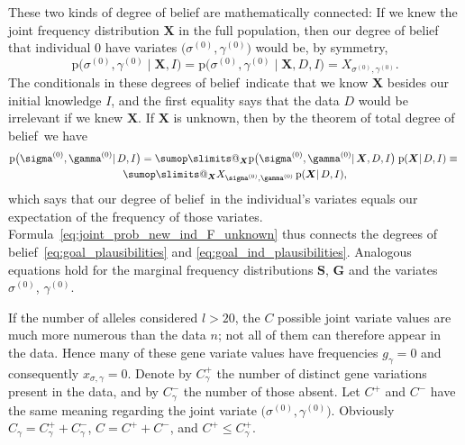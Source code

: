 \documentclass[\ifafour a4paper,12pt,\else a5paper,10pt,\fi%
onecolumn,oneside,article,%
british%
]{memoir}
\makeatletter
\theoremstyle{remark}
\theoremstyle{innote}
\def\sum{\DOTSI\sumop\slimits@}
\renewcommand{\le}{\leqslant}%
\newcommand*{\pf}{\mathrm{p}}%
\renewcommand*{\|}{\mathpunct{|}}
\newcommand*{\dob}{degree of belief}
\newcommand*{\dobs}{degrees of belief}
\newcommand*{\yD}{D}
\newcommand*{\yI}{I}
\newcommand*{\ys}{\sigma}
\newcommand*{\yg}{\gamma}
\newcommand*{\gn}{l}
\newcommand*{\ysi}[1]{\ys^{(#1)}}
\newcommand*{\ygi}[1]{\yg^{(#1)}}
\newcommand*{\yso}{\ysi{0}}
\newcommand*{\ygo}{\ygi{0}}
\newcommand*{\yFs}{\bm{S}}
\newcommand*{\yFg}{\bm{G}}
\newcommand*{\yF}{\bm{X}}
\newcommand*{\yCg}{C_{\gamma}}
\newcommand*{\yCgd}{\yCg^{+}}
\newcommand*{\yCgn}{\yCg^{-}}
\newcommand*{\yCd}{C^{+}}
\newcommand*{\yCn}{C^{-}}
\makeatother
\begin{document}
These two kinds of degree of belief are mathematically connected: If we
knew the joint frequency distribution $\yF$ in the full population, then
our degree of belief that individual $0$ have variates $\bigl( \yso,\ygo
\bigr)$ would be, by symmetry,
\begin{equation}
  \label{eq:joint_prob_new_ind_F_known}
  \pf\bigl(\yso, \ygo \| \yF, \yI\bigr)  =
  \pf\bigl(\yso, \ygo \| \yF, \yD, \yI\bigr)  =
  X_{\yso, \ygo}.
\end{equation}
The conditionals in these \dobs\ indicate that we know $\yF$ besides our
initial knowledge $\yI$, and the first equality says that the data $\yD$
would be irrelevant if we knew $\yF$. If $\yF$ is unknown, then by the
theorem of total \dob\ we have
\begin{multline}
  \label{eq:joint_prob_new_ind_F_unknown}
  \pf\bigl(\yso, \ygo \| \yD, \yI\bigr)  =
  \sum_{\yF}  \pf\bigl(\yso, \ygo \| \yF, \yD, \yI\bigr) \;
  \pf( \yF \| \yD, \yI) \equiv{}\\
  \sum_{\yF}  X_{\yso, \ygo}\,  \pf( \yF \| \yD, \yI),
\end{multline}
which says that our \dob\ in the individual's variates equals our
expectation of the frequency of those variates.
Formula~\eqref{eq:joint_prob_new_ind_F_unknown} thus connects the degrees
of belief~\eqref{eq:goal_plausibilities} and
\eqref{eq:goal_ind_plausibilities}. Analogous equations hold for the
marginal frequency distributions $\yFs$, $\yFg$ and the variates $\yso$,
$\ygo$.


If the number of alleles considered $\gn>20$, the $C$ possible joint
variate values are much more numerous than the data $n$; not all of them
can therefore appear in the data. Hence many of these gene variate values
have frequencies $g_{\yg}=0$ and consequently $x_{\ys,\yg}=0$. Denote by
$\yCgd$ the number of distinct gene variations present in the data, and by
$\yCgn$ the number of those absent. Let $\yCd$ and $\yCn$ have the same
meaning regarding the joint variate $\bigl( \ysi{0}, \ygi{0} \bigr)$.
Obviously $\yCg = \yCgd+\yCgn$, $C=\yCd+\yCn$, and $\yCd \le \yCgd$.
\end{document}
